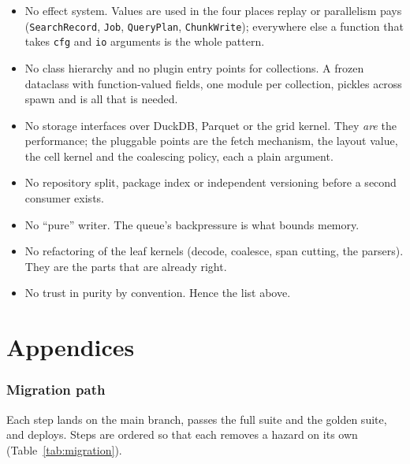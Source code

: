 \documentclass[10pt,a4paper]{article}
\newcommand{\code}[1]{\texttt{#1}}
\begin{document}
\begin{itemize}
\item No effect system. Values are used in the four places replay or parallelism pays (\code{SearchRecord},
  \code{Job}, \code{QueryPlan}, \code{ChunkWrite}); everywhere else a function that takes \code{cfg} and
  \code{io} arguments is the whole pattern.
\item No class hierarchy and no plugin entry points for collections. A frozen dataclass with function-valued
  fields, one module per collection, pickles across spawn and is all that is needed.
\item No storage interfaces over DuckDB, Parquet or the grid kernel. They \emph{are} the performance; the
  pluggable points are the fetch mechanism, the layout value, the cell kernel and the coalescing policy, each a
  plain argument.
\item No repository split, package index or independent versioning before a second consumer exists.
\item No ``pure'' writer. The queue's backpressure is what bounds memory.
\item No refactoring of the leaf kernels (decode, coalesce, span cutting, the parsers). They are the parts that
  are already right.
\item No trust in purity by convention. Hence the list above.
\end{itemize}

\appendix
\clearpage

\part*{Appendices}

\section{Migration path}
\label{app:migration}

Each step lands on the main branch, passes the full suite and the golden suite, and deploys. Steps are ordered so
that each removes a hazard on its own (Table~\ref{tab:migration}).
\end{document}
